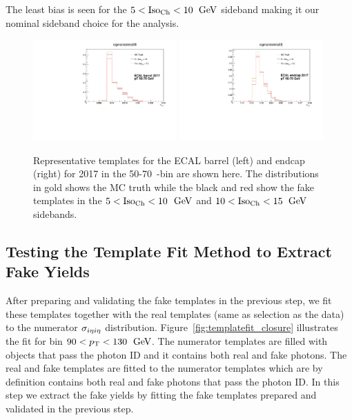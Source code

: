 
The least bias is seen for the $5 < \text{Iso}_{\text{Ch}} < 10$ $\,\text{Ge\hspace{-.08em}V}$ sideband making it our nominal sideband choice for the analysis.


\begin{figure}[!htbp]
  \centering
  \includegraphics[width=0.49\textwidth]{fig/MCtemplates_pT50To70EB2017.pdf}
  \includegraphics[width=0.49\textwidth]{fig/MCtemplates_pT50To70EE2017.pdf}
  \caption{Representative \sieie templates for the ECAL barrel (left) and endcap (right) for 2017 in the 50-70~\GeV \pt-bin are shown here. The distributions in gold shows the MC truth while the black and red show the fake templates in the $5 < \text{Iso}_{\text{Ch}} < 10$ $\,\text{Ge\hspace{-.08em}V}$ and $10 < \text{Iso}_{\text{Ch}} < 15$ $\,\text{Ge\hspace{-.08em}V}$ sidebands.}
  \label{fig:template_comparisons}
\end{figure}

\subsection{Testing the Template Fit Method to Extract Fake Yields}

After preparing and validating the fake templates in the previous step, we fit these templates together with the real templates (same as selection as the data) to the numerator $\sigma_{i\eta i\eta}$ distribution. Figure~\ref{fig:templatefit_closure} illustrates the fit for \pt bin $90 < p_{\mathrm{T}} < 130$ $\,\text{Ge\hspace{-.08em}V}$. The numerator templates are filled with objects that pass the photon ID and it contains both real and fake photons. The real and fake templates are fitted to the numerator templates which are by definition contains both real and fake photons that pass the photon ID. In this step we extract the fake yields by fitting the fake templates prepared and validated in the previous step.

